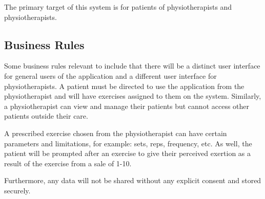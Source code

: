 \documentclass[12pt]{article}
\begin{document}
The primary target of this system is for patients of physiotherapists and physiotherapists.

\subsection{Business Rules}

Some business rules relevant to include that there will be a distinct user interface for general users of the application and a different user interface for physiotherapists. A patient must be directed to use the application from the physiotherapist and will have exercises assigned to  them on the system. Similarly, a physiotherapist can view and manage their patients but cannot access other patients outside their care.


A prescribed exercise chosen from the physiotherapist can have certain parameters and limitations, for example: sets, reps, frequency, etc. As well, the patient will be prompted after an exercise to give their perceived exertion as a result of the exercise from a sale of 1-10.


Furthermore, any data will not be shared without any explicit consent and stored securely.
\end{document}
